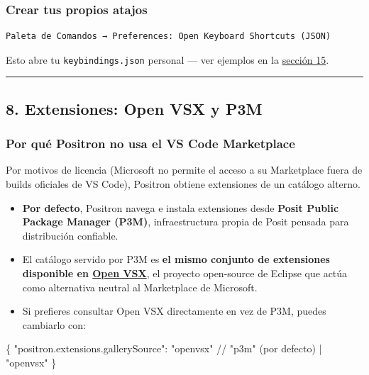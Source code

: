 \documentclass[
  doc,
  floatsintext,
  longtable,
  a4paper,
  nolmodern,
  notxfonts,
  notimes,
  12pt,
  colorlinks=true,linkcolor=blue,citecolor=blue,urlcolor=blue]{apa7}
\newenvironment{Shaded}{\begin{snugshade}}{\end{snugshade}}
\newcommand{\DataTypeTok}[1]{\textcolor[rgb]{0.68,0.00,0.00}{#1}}
\newcommand{\ErrorTok}[1]{\textcolor[rgb]{0.68,0.00,0.00}{#1}}
\newcommand{\FunctionTok}[1]{\textcolor[rgb]{0.28,0.35,0.67}{#1}}
\newcommand{\StringTok}[1]{\textcolor[rgb]{0.13,0.47,0.30}{#1}}
\providecommand{\tightlist}{%
  \setlength{\itemsep}{0pt}\setlength{\parskip}{0pt}}
\begin{document}
\subsubsection{Crear tus propios atajos}\label{crear-tus-propios-atajos}

\begin{verbatim}
Paleta de Comandos → Preferences: Open Keyboard Shortcuts (JSON)
\end{verbatim}

Esto abre tu \texttt{keybindings.json} personal --- ver ejemplos en la
\hyperref[15-atajos-personalizados-keybindingsjson]{sección 15}.

\begin{center}\rule{0.5\linewidth}{0.5pt}\end{center}

\subsection{8. Extensiones: Open VSX y
P3M}\label{extensiones-open-vsx-y-p3m}

\subsubsection{Por qué Positron no usa el VS Code
Marketplace}\label{por-quuxe9-positron-no-usa-el-vs-code-marketplace}

Por motivos de licencia (Microsoft no permite el acceso a su Marketplace
fuera de builds oficiales de VS Code), Positron obtiene extensiones de
un catálogo alterno.

\begin{itemize}
\tightlist
\item
  \textbf{Por defecto}, Positron navega e instala extensiones desde
  \textbf{Posit Public Package Manager (P3M)}, infraestructura propia de
  Posit pensada para distribución confiable.
\item
  El catálogo servido por P3M es \textbf{el mismo conjunto de
  extensiones disponible en \href{https://open-vsx.org/}{Open VSX}}, el
  proyecto open-source de Eclipse que actúa como alternativa neutral al
  Marketplace de Microsoft.
\item
  Si prefieres consultar Open VSX directamente en vez de P3M, puedes
  cambiarlo con:
\end{itemize}

\begin{Shaded}
\begin{Highlighting}[]
\FunctionTok{\{}
  \DataTypeTok{"positron.extensions.gallerySource"}\FunctionTok{:} \StringTok{"openvsx"} \ErrorTok{//} \StringTok{"p3m"} \ErrorTok{(por} \ErrorTok{defecto)} \ErrorTok{|} \StringTok{"openvsx"}
\FunctionTok{\}}
\end{Highlighting}
\end{Shaded}
\end{document}
